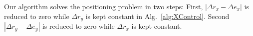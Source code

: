 Our algorithm solves the positioning problem in two steps: 
First, $|\Delta r_x - \Delta e_x |$ is reduced to zero while  $\Delta r_y$ is kept constant in Alg.~\ref{alg:XControl}. 
Second $|\Delta r_y - \Delta e_y |$ is reduced to zero while  $\Delta r_x$ is kept constant.%

%
%

